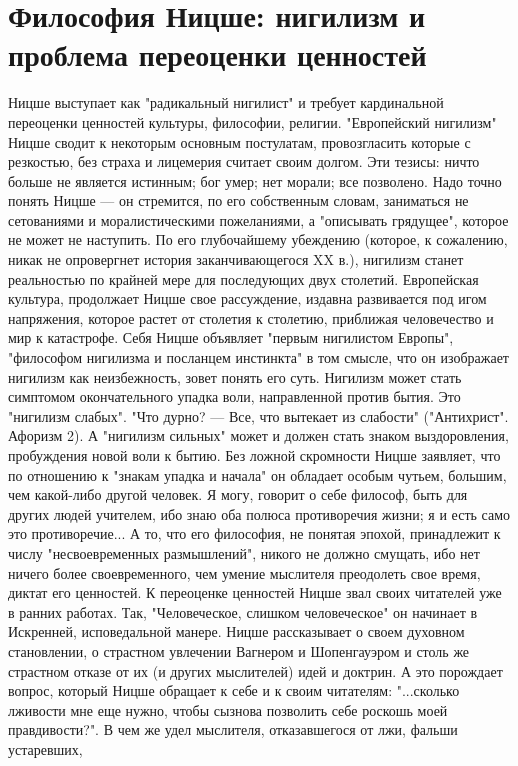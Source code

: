 \documentclass[12pt]{article}
\begin{document}
\section{Философия Ницше: нигилизм и проблема переоценки ценностей}
Ницше выступает как "радикальный нигилист" и требует кардинальной переоценки ценностей культуры,
философии, религии. "Европейский нигилизм" Ницше сводит к некоторым основным постулатам,
провозгласить которые с резкостью, без страха и лицемерия считает своим долгом. Эти тезисы: ничто больше не
является истинным; бог умер; нет морали; все позволено. Надо точно понять Ницше — он стремится, по его
собственным словам, заниматься не сетованиями и моралистическими пожеланиями, а "описывать грядущее",
которое не может не наступить. По его глубочайшему убеждению (которое, к сожалению, никак не опровергнет
история заканчивающегося XX в.), нигилизм станет реальностью по крайней мере для последующих двух
столетий. Европейская культура, продолжает Ницше свое рассуждение, издавна развивается под игом
напряжения, которое растет от столетия к столетию, приближая человечество и мир к катастрофе. Себя Ницше
объявляет "первым нигилистом Европы", "философом нигилизма и посланцем инстинкта" в том смысле, что он
изображает нигилизм как неизбежность, зовет понять его суть. Нигилизм может стать симптомом
окончательного упадка воли, направленной против бытия. Это "нигилизм слабых". "Что дурно? — Все, что
вытекает из слабости" ("Антихрист". Афоризм 2). А "нигилизм сильных" может и должен стать знаком
выздоровления, пробуждения новой воли к бытию. Без ложной скромности Ницше заявляет, что по отношению
к "знакам упадка и начала" он обладает особым чутьем, большим, чем какой-либо другой человек. Я могу,
говорит о себе философ, быть для других людей учителем, ибо знаю оба полюса противоречия жизни; я и есть
само это противоречие... А то, что его философия, не понятая эпохой, принадлежит к числу "несвоевременных
размышлений", никого не должно смущать, ибо нет ничего более своевременного, чем умение мыслителя
преодолеть свое время, диктат его ценностей. К переоценке ценностей Ницше звал своих читателей уже в
ранних работах. Так, "Человеческое, слишком человеческое" он начинает в Искренней, исповедальной манере.
Ницше рассказывает о своем духовном становлении, о страстном увлечении Вагнером и Шопенгауэром и столь
же страстном отказе от их (и других мыслителей) идей и доктрин. А это порождает вопрос, который Ницше
обращает к себе и к своим читателям: "...сколько лживости мне еще нужно, чтобы сызнова позволить себе
роскошь моей правдивости?". В чем же удел мыслителя, отказавшегося от лжи, фальши устаревших,
\end{document}
